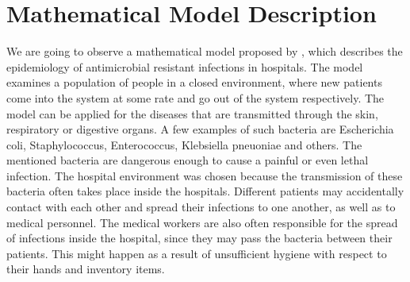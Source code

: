 \chapter*{Mathematical Model Description}


We are going to observe a mathematical model proposed by \cite{lips}, which describes the epidemiology of antimicrobial resistant infections in hospitals. The model examines a population of people in a closed environment, where new patients come into the system at some rate and go out of the system respectively. The model can be applied for the diseases that are transmitted through the skin, respiratory or digestive organs. A few examples of such bacteria are Escherichia coli, Staphylococcus, Enterococcus, Klebsiella pneuoniae and others. The mentioned bacteria are dangerous enough to cause a painful or even lethal infection. The hospital environment was chosen because the transmission of these bacteria often takes place inside the hospitals. Different patients may accidentally contact with each other and spread their infections to one another, as well as to medical personnel. The medical workers are also often responsible for the spread of infections inside the hospital, since they may pass the bacteria between their patients. This might happen as a result of unsufficient hygiene with respect to their hands and inventory items.